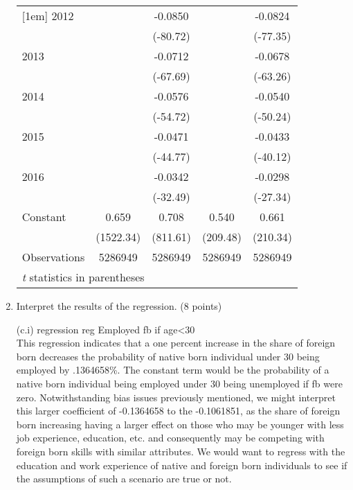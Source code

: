 \documentclass{article}
\begin{document}
\begin{enumerate}[label=\alph*]
\begin{table}[htbp]
\begin{tabular}{l*{4}{c}}
[1em]
2012                &            &     -0.0850&            &     -0.0824\\
                    &            &    (-80.72)&            &    (-77.35)\\
[1em]
2013                &            &     -0.0712&            &     -0.0678\\
                    &            &    (-67.69)&            &    (-63.26)\\
[1em]
2014                &            &     -0.0576&            &     -0.0540\\
                    &            &    (-54.72)&            &    (-50.24)\\
[1em]
2015                &            &     -0.0471&            &     -0.0433\\
                    &            &    (-44.77)&            &    (-40.12)\\
[1em]
2016                &            &     -0.0342&            &     -0.0298\\
                    &            &    (-32.49)&            &    (-27.34)\\
[1em]
Constant            &       0.659&       0.708&       0.540&       0.661\\
                    &   (1522.34)&    (811.61)&    (209.48)&    (210.34)\\
\hline
Observations        &     5286949&     5286949&     5286949&     5286949\\
\hline\hline
\multicolumn{5}{l}{\footnotesize \textit{t} statistics in parentheses}\\
\end{tabular}
\end{table}


\item Interpret the results of the regression. (8 points)

(c.i) regression reg Employed fb if age<30\\

This regression indicates that a one percent increase in the share of foreign born decreases the probability of native born individual under 30 being employed by .1364658\%. The constant term would be the probability of a native born individual being employed under 30 being unemployed if fb were zero. Notwithstanding bias issues previously mentioned, we might interpret this larger coefficient of                  -0.1364658 to the  -0.1061851, as the share of foreign born increasing having a larger effect on those who may be younger with less job experience, education, etc. and consequently may be competing with foreign born skills with similar attributes. We would want to regress with the education and work experience of native and foreign born individuals to see if the assumptions of such a scenario are true or not.


\end{enumerate}
\end{document}
